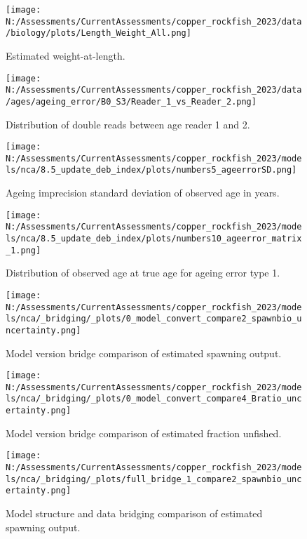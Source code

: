\documentclass[11pt,
  english,
  letterpaper,
]{article}
\begin{document}
\begin{figure}
\centering
\texttt{[image: N:/Assessments/CurrentAssessments/copper\_rockfish\_2023/data/biology/plots/Length\_Weight\_All.png]}
\caption{Estimated weight-at-length.\label{fig:weight-length}}
\end{figure}

\begin{figure}
\centering
\texttt{[image: N:/Assessments/CurrentAssessments/copper\_rockfish\_2023/data/ages/ageing\_error/B0\_S3/Reader\_1\_vs\_Reader\_2.png]}
\caption{Distribution of double reads between age reader 1 and 2.\label{fig:age-error-dist}}
\end{figure}

\begin{figure}
\centering
\texttt{[image: N:/Assessments/CurrentAssessments/copper\_rockfish\_2023/models/nca/8.5\_update\_deb\_index/plots/numbers5\_ageerrorSD.png]}
\caption{Ageing imprecision standard deviation of observed age in years.\label{fig:age-error}}
\end{figure}

\begin{figure}
\centering
\texttt{[image: N:/Assessments/CurrentAssessments/copper\_rockfish\_2023/models/nca/8.5\_update\_deb\_index/plots/numbers10\_ageerror\_matrix\_1.png]}
\caption{Distribution of observed age at true age for ageing error type 1.\label{fig:age-error-matrix}}
\end{figure}

\begin{figure}
\centering
\texttt{[image: N:/Assessments/CurrentAssessments/copper\_rockfish\_2023/models/nca/\_bridging/\_plots/0\_model\_convert\_compare2\_spawnbio\_uncertainty.png]}
\caption{Model version bridge comparison of estimated spawning output.\label{fig:bridge-ssb}}
\end{figure}

\begin{figure}
\centering
\texttt{[image: N:/Assessments/CurrentAssessments/copper\_rockfish\_2023/models/nca/\_bridging/\_plots/0\_model\_convert\_compare4\_Bratio\_uncertainty.png]}
\caption{Model version bridge comparison of estimated fraction unfished.\label{fig:bridge-depl}}
\end{figure}

\begin{figure}
\centering
\texttt{[image: N:/Assessments/CurrentAssessments/copper\_rockfish\_2023/models/nca/\_bridging/\_plots/full\_bridge\_1\_compare2\_spawnbio\_uncertainty.png]}
\caption{Model structure and data bridging comparison of estimated spawning output.\label{fig:data-bridge-ssb-1}}
\end{figure}
\end{document}
